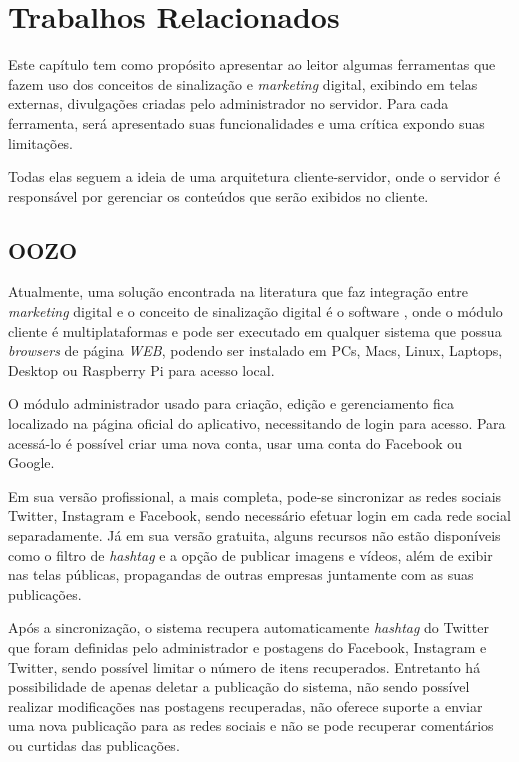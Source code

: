 \chapter[Trabalhos Relacionados]{Trabalhos Relacionados}
Este capítulo tem como propósito apresentar ao leitor algumas ferramentas que fazem uso dos conceitos de sinalização e \textit{marketing} digital, exibindo em telas externas, divulgações criadas pelo administrador no servidor. Para cada ferramenta, será apresentado suas funcionalidades e  uma crítica expondo suas limitações.

Todas elas seguem a ideia de uma arquitetura cliente-servidor, onde o servidor é responsável por gerenciar os conteúdos que serão exibidos no cliente.

\section{OOZO}
\label{sec:oozo}
Atualmente, uma solução encontrada na literatura que faz integração entre \textit{marketing} digital e o conceito de sinalização digital é o software \cite{oozo2017}, onde o módulo cliente é multiplataformas e pode ser executado em qualquer sistema que possua \textit{browsers} de página \textit{WEB}, podendo ser instalado em PCs, Macs, Linux, Laptops, Desktop ou Raspberry Pi para acesso local.

O módulo administrador usado para criação, edição e gerenciamento fica localizado na página oficial do aplicativo, necessitando de login para acesso. Para acessá-lo é possível criar uma nova conta, usar uma conta do Facebook ou Google. 

Em sua versão profissional, a mais completa, pode-se sincronizar as redes sociais Twitter, Instagram e Facebook, sendo necessário efetuar login em cada rede social separadamente. Já em sua versão gratuita, alguns recursos não estão disponíveis como o filtro de \textit{hashtag} e a opção de publicar imagens e vídeos, além de exibir nas telas públicas, propagandas de outras empresas juntamente com as suas publicações. 

Após a sincronização, o sistema recupera automaticamente \textit{hashtag} do Twitter que foram definidas pelo administrador e postagens do Facebook, Instagram e Twitter, sendo possível limitar o número de itens recuperados. Entretanto há possibilidade de apenas deletar a publicação do sistema, não sendo possível realizar modificações nas postagens recuperadas, não oferece suporte a enviar uma nova publicação para as redes sociais e não se pode recuperar comentários ou curtidas das publicações.

